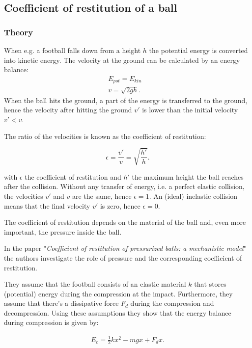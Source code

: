 \documentclass{article}
\begin{document}
\newpage

\subsection{Coefficient of restitution of a ball}
\subsubsection{Theory}
When e.g. a football falls down from a height $h$ the potential energy is converted into kinetic energy. The velocity at the ground can be calculated by an energy balance:
\begin{align}
    E_{pot} = E_{kin} & \\
    v = \sqrt{2gh}.
\end{align}
When the ball hits the ground, a part of the energy is transferred to the ground, hence the velocity after hitting the ground $v'$ is lower than the initial velocity $v'< v$. 

The ratio of the velocities is known as the coefficient of restitution:

\begin{equation}
    \epsilon = \frac{v'}{v} = \sqrt{\frac{h'}{h}}.
\end{equation}

with $\epsilon$ the coefficient of restitution and $h'$ the maximum height the ball reaches after the collision. Without any transfer of energy, i.e. a perfect elastic collision, the velocities $v'$ and $v$ are the same, hence $\epsilon = 1$. An (ideal) inelastic collision means that the final velocity $v'$ is zero, hence $\epsilon = 0$.

The coefficient of restitution depends on the material of the ball and, even more important, the pressure inside the ball. 

In the paper "\textit{Coefficient of restitution of pressurized balls: a mechanistic model}" the authors investigate the role of pressure and the corresponding coefficient of restitution.

They assume that the football consists of an elastic material $k$ that stores (potential) energy during the compression at the impact. Furthermore, they assume that there's a dissipative force $F_d$ during the compression and decompression. Using these assumptions they show that the energy balance during compression is given by:

\begin{align}
    E_c = \frac{1}{2}kx^2 - mgx +F_d x.
\end{align}
\end{document}
